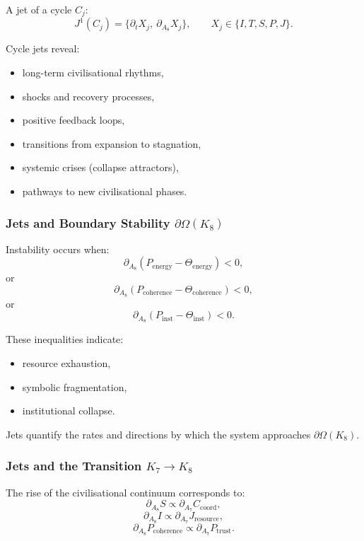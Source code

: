 A jet of a cycle $C_j$:
\[
J^1(C_j)=
\{\partial_t X_j,\ \partial_{A_8}X_j\},
\qquad 
X_j\in\{I,T,S,P,J\}.
\]

Cycle jets reveal:
\begin{itemize}
    \item long-term civilisational rhythms,
    \item shocks and recovery processes,
    \item positive feedback loops,
    \item transitions from expansion to stagnation,
    \item systemic crises (collapse attractors),
    \item pathways to new civilisational phases.
\end{itemize}


\subsubsection{Jets and Boundary Stability \texorpdfstring{$\partial\Omega(K_8)$}{\partial\Omega(K_8)}}

Instability occurs when:
\[
\partial_{A_8}(P_{\mathrm{energy}} - \Theta_{\mathrm{energy}})<0,
\]
or
\[
\partial_{A_8}(P_{\mathrm{coherence}} - \Theta_{\mathrm{coherence}})<0,
\]
or
\[
\partial_{A_8}(P_{\mathrm{inst}} - \Theta_{\mathrm{inst}})<0.
\]

These inequalities indicate:
\begin{itemize}
    \item resource exhaustion,
    \item symbolic fragmentation,
    \item institutional collapse.
\end{itemize}

Jets quantify the rates and directions by which the system approaches
$\partial\Omega(K_8)$.


\subsubsection{Jets and the Transition \texorpdfstring{$K_7 \to K_8$}{K_7 \to K_8}}

The rise of the civilisational continuum corresponds to:
\[
\partial_{A_8}S
\propto
\partial_{A_7}C_{\mathrm{coord}},
\]
\[
\partial_{A_8}I
\propto
\partial_{A_7}J_{\mathrm{resource}},
\]
\[
\partial_{A_8}P_{\mathrm{coherence}}
\propto
\partial_{A_7}P_{\mathrm{trust}}.
\]

